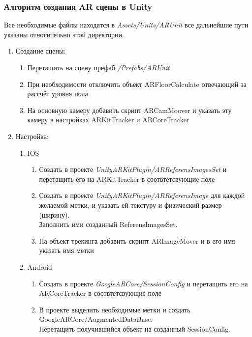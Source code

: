 \documentclass[a4paper, 11pt, titlepage]{article}
\begin{document}
      \subsubsection{Алгоритм создания AR сцены в Unity}
        Все необходимые файлы находятся в \textit{Assets/Units/ARUnit} все дальнейшие пути указаны относительно этой директории.
        \begin{enumerate}
          \item Создание сцены:
            \begin{enumerate}
              \item Перетащить на сцену префаб \textit{/Prefabs/ARUnit}
              \item При необходимости отключить объект ARFloorCalculate отвечающий за рассчёт уровня пола
              \item На основную камеру добавить скрипт ARCamMoover и указать эту камеру в настройках ARKitTracker и ARCoreTracker
            \end{enumerate}
            \item Настройка:
              \begin{enumerate}
                \item IOS
                \begin{enumerate}
                  \item Создать в проекте \textit{UnityARKitPlugin/ARReferensImagesSet} и перетащить его на ARKitTracker в соотвтетсвующие поле
                  \item Создать в проекте \textit{UnityARKitPlugin/ARReferensImage} для каждой желаемой метки, и указать ей текстуру и физический размер (ширину). \\
                    Заполнить ими созданный ReferensImagesSet.
                  \item На объект трекинга добавить скрипт ARImageMover и в его имя указать имя метки
                \end{enumerate}
                \item Android
                  \begin{enumerate}
                  \item Создать в проекте \textit{GoogleARCore/SessionConfig} и перетащить его на ARCoreTracker в соотвтетсвующие поле
                  \item В проекте выделить необходимые метки и создать GoogleARCore/AugmentedDataBase. \\
                    Перетащить получившийся объект на созданный SessionConfig.

\end{enumerate}
\end{enumerate}
\end{enumerate}
\end{document}
